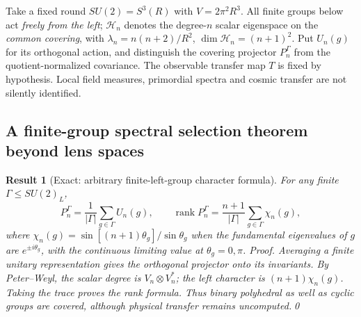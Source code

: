 \documentclass[aps,prd,onecolumn,notitlepage,groupedaddress,11pt]{revtex4-2}
\newtheorem{result}{Result}
\begin{document}
Take a fixed round \(SU(2)=S^3(R)\) with \(V=2\pi^2R^3\). All finite groups below act \emph{freely from the left}; \(\mathcal H_n\) denotes the degree-\(n\) scalar eigenspace on the \emph{common covering}, with \(\lambda_n=n(n+2)/R^2\), \(\dim\mathcal H_n=(n+1)^2\). Put \(U_n(g)\) for its orthogonal action, and distinguish the covering projector \(P_n^\Gamma\) from the quotient-normalized covariance. The observable transfer map \(T\) is fixed by hypothesis. Local field measures, primordial spectra and cosmic transfer are not silently identified.

\subsection{A finite-group spectral selection theorem beyond lens spaces}
\begin{result}[\textsf{Exact}: arbitrary finite-left-group character formula]\label{new:139}
For any finite \(\Gamma\le SU(2)_L\),
\begin{equation}\label{new:eq139}
P_n^\Gamma=\frac1{|\Gamma|}\sum_{g\in\Gamma}U_n(g),\qquad
\operatorname{rank}P_n^\Gamma=\frac{n+1}{|\Gamma|}\sum_{g\in\Gamma}\chi_n(g),
\end{equation}
where \(\chi_n(g)=\sin[(n+1)\theta_g]/\sin\theta_g\) when the fundamental eigenvalues of \(g\) are \(e^{\pm i\theta_g}\), with the continuous limiting value at \(\theta_g=0,\pi\).
\textit{Proof.} Averaging a finite unitary representation gives the orthogonal projector onto its invariants. By Peter--Weyl, the scalar degree is \(V_n\otimes V_n^*\); the left character is \((n+1)\chi_n(g)\). Taking the trace proves the rank formula. Thus binary polyhedral as well as cyclic groups are covered, although physical transfer remains uncomputed.\qed
\end{result}
\end{document}
